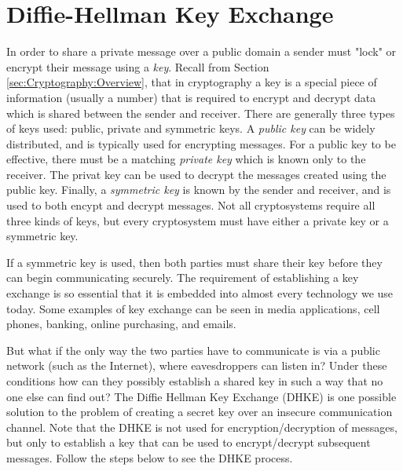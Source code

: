 \section{Diffie-Hellman Key Exchange}\label{sec:FurtherTopicsCryptography:DHKE1}

In order to share a private message over a public domain a sender must  "lock" or encrypt their message using a \emph{key}.  Recall from Section \ref{sec:Cryptography:Overview}, that in cryptography a  key is a special piece of information (usually a number)  that is required to encrypt and decrypt data which is shared between the sender and receiver. There are generally three types of keys used: public, private and symmetric keys. A \emph{public key} can be widely distributed, and is typically used for encrypting messages.  For a public key to be effective, there must be a matching \emph{private key} which is known only to the receiver. The privat key can be used to decrypt the messages created using the public key.  Finally, a \emph{symmetric key} is known by the sender and receiver, and is used to both encypt and decrypt messages.  Not all cryptosystems require all three kinds of keys, but every cryptosystem must have either a private key or a symmetric key.

  If a symmetric key is used, then both parties must share their key before they can begin communicating securely. The requirement of establishing a key exchange is so essential that it is embedded into almost every technology we use today.  Some examples of key exchange can be seen in media applications, cell phones, banking, online purchasing, and emails.  

 But what if the only way the two parties have to communicate is via a public network (such as the Internet), where eavesdroppers can listen in?  Under these conditions how can they possibly establish a shared key in such a way that no one else can find out?  The Diffie Hellman Key Exchange (DHKE) is one possible solution to the problem of creating a secret key over an insecure communication channel.  Note that the DHKE is not used for encryption/decryption of messages, but only to establish a key that can be used to encrypt/decrypt subsequent messages.  Follow the steps below to see the DHKE process.  

